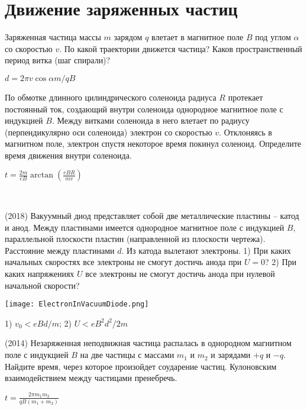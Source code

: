 \section{Движение заряженных частиц}

\begin{ex}
Заряженная частица массы $m$ зарядом $q$ влетает в магнитное поле $B$ под углом $\alpha$ со скоростью $v$. По какой траектории движется частица? Каков пространственный период витка (шаг спирали)?
\begin{ans}
$d = 2 \pi v \cos \alpha m / qB$
\end{ans}
\end{ex}

\begin{ex}
По обмотке длинного цилиндрического соленоида радиуса $R$ протекает постоянный ток, создающий внутри соленоида однородное магнитное поле с индукцией $B$. Между витками соленоида в него влетает по радиусу (перпендикулярно оси соленоида) электрон со скоростью $v$. Отклоняясь в магнитном поле, электрон спустя некоторое время покинул соленоид. Определите время движения внутри соленоида.
\begin{ans}
$t=\frac{2m}{eB}\arctan \left( \frac{eBR}{mv}\right)$
\end{ans}
\end{ex}

\begin{ex}
\hspace{0pt} \\
\begin{minipage}{.65\textwidth}
(2018) Вакуумный диод представляет собой две металлические пластины -- катод и анод. Между пластинами имеется однородное магнитное поле с индукцией $B$, параллельной плоскости пластин (направленной из плоскости чертежа). Расстояние между пластинами $d$. Из катода вылетают электроны. 1) При каких начальных скоростях все электроны не смогут достичь анода при $U = 0$? 2) При каких напряжениях $U$ все электроны не смогут достичь анода при нулевой начальной скорости?
\end{minipage}
\begin{minipage}{.35\textwidth}
\centering
\texttt{[image: ElectronInVacuumDiode.png]}
\end{minipage}
\begin{ans}
1) $v_0 < eBd/m$; 2) $U < eB^2d^2/2m$
\end{ans}
\end{ex}

\begin{ex}
(2014) Незаряженная неподвижная частица распалась в однородном магнитном поле с индукцией $B$ на две частицы с массами $m_1$ и $m_2$ и зарядами $+q$ и $-q$. Найдите время, через которое произойдет соударение частиц. Кулоновским взаимодействием между частицами пренебречь.
\begin{ans}
$t = \frac{2\pi m_1 m_2}{qB(m_1+m_2)}$
\end{ans}
\end{ex}

